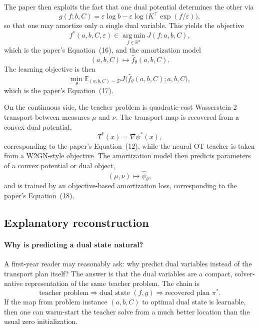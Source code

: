 \documentclass[11pt]{report}
\newcommand{\R}{\mathbb{R}}
\newcommand{\E}{\mathbb{E}}
\newcommand{\argmin}{\operatorname*{arg\,min}}
\begin{document}
The paper then exploits the fact that one dual potential determines the other via
\begin{equation}
g(f;b,C) = \varepsilon \log b - \varepsilon \log\bigl(K^{\top}\exp(f/\varepsilon)\bigr),
\label{eq:metaot-dual-map}
\end{equation}
so that one may amortize only a single dual variable.  This yields the objective
\begin{equation}
f^*(a,b,C,\varepsilon)
\in
\argmin_{f\in\R^n} J(f;a,b,C),
\label{eq:metaot-single-dual-objective}
\end{equation}
which is the paper's Equation~(16), and the amortization model
\begin{equation}
(a,b,C) \longmapsto \widehat f_\theta(a,b,C).
\label{eq:metaot-predicted-discrete-dual}
\end{equation}
The learning objective is then
\begin{equation}
\min_\theta \E_{(a,b,C)\sim\mathcal D} J\bigl(\widehat f_\theta(a,b,C);a,b,C\bigr),
\label{eq:metaot-amortization-loss}
\end{equation}
which is the paper's Equation~(17).

On the continuous side, the teacher problem is quadratic-cost Wasserstein-2
transport between measures $\mu$ and $\nu$.  The transport map is recovered from a
convex dual potential,
\begin{equation}
T^*(x)=\nabla \psi^*(x),
\label{eq:metaot-continuous-map}
\end{equation}
corresponding to the paper's Equation~(12), while the neural OT teacher is taken
from a W2GN-style objective.  The amortization model then predicts parameters of a
convex potential or dual object,
\begin{equation}
(\mu,\nu) \longmapsto \widehat\psi_\theta,
\label{eq:metaot-predicted-continuous-dual}
\end{equation}
and is trained by an objective-based amortization loss, corresponding to the
paper's Equation~(18).

\subsection*{Explanatory reconstruction}

\paragraph{Why is predicting a dual state natural?}
A first-year reader may reasonably ask: why predict dual variables instead of the
transport plan itself?  The answer is that the dual variables are a compact,
solver-native representation of the same teacher problem.  The chain is
\begin{equation}
\text{teacher problem}
\Longrightarrow
\text{dual state }(f,g)
\Longrightarrow
\text{recovered plan }\pi^*.
\label{eq:metaot-representation-chain}
\end{equation}
If the map from problem instance $(a,b,C)$ to optimal dual state is learnable, then
one can warm-start the teacher solve from a much better location than the usual
zero initialization.
\end{document}
